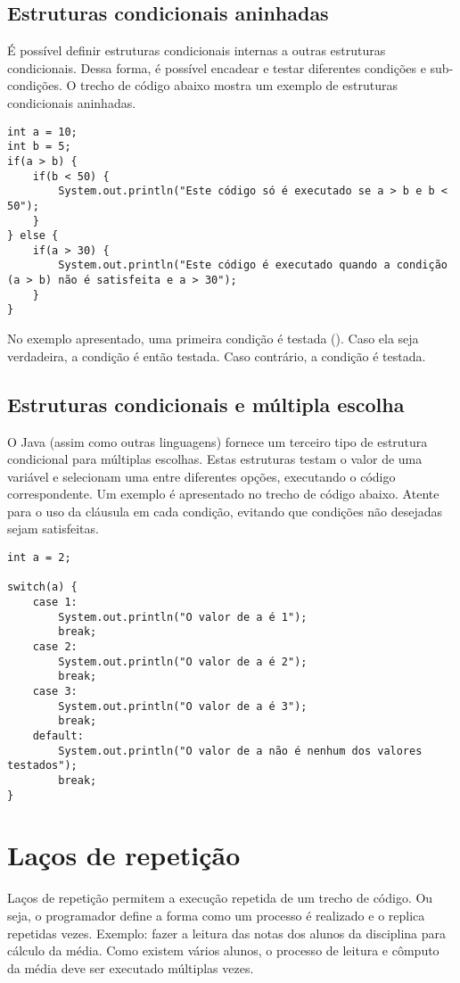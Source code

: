 \subsection{Estruturas condicionais aninhadas}
É possível definir estruturas condicionais internas a outras estruturas condicionais. Dessa forma, é possível encadear e testar diferentes condições e sub-condições. O trecho de código abaixo mostra um exemplo de estruturas condicionais aninhadas.

\begin{verbatim}
int a = 10;
int b = 5;
if(a > b) {
	if(b < 50) {
		System.out.println("Este código só é executado se a > b e b < 50");
	}
} else {
	if(a > 30) {
		System.out.println("Este código é executado quando a condição (a > b) não é satisfeita e a > 30");
	}
}
\end{verbatim}

No exemplo apresentado, uma primeira condição é testada (). Caso ela seja verdadeira, a condição  é então testada. Caso contrário, a condição  é testada.

\subsection{Estruturas condicionais e múltipla escolha}
O Java (assim como outras linguagens) fornece um terceiro tipo de estrutura condicional para múltiplas escolhas. Estas estruturas testam o valor de uma variável e selecionam uma entre diferentes opções, executando o código correspondente. Um exemplo é apresentado no trecho de código abaixo. Atente para o uso da cláusula  em cada condição, evitando que condições não desejadas sejam satisfeitas.

\begin{verbatim}
int a = 2;

switch(a) {
	case 1:
		System.out.println("O valor de a é 1");
		break;
	case 2:
		System.out.println("O valor de a é 2");
		break;
	case 3:
		System.out.println("O valor de a é 3");
		break;
	default:
		System.out.println("O valor de a não é nenhum dos valores testados");
		break;
}

\end{verbatim}

\section{Laços de repetição}
Laços de repetição permitem a execução repetida de um trecho de código. Ou seja, o programador define a forma como um processo é realizado e o replica repetidas vezes. Exemplo: fazer a leitura das notas dos alunos da disciplina para cálculo da média. Como existem vários alunos, o processo de leitura e cômputo da média deve ser executado múltiplas vezes.

